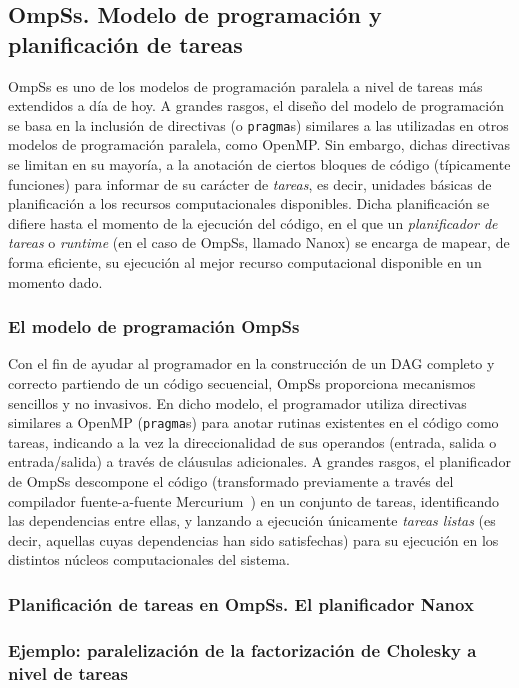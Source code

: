 \subsection{OmpSs. Modelo de programación y planificación de tareas}

OmpSs es uno de los modelos de programación paralela a nivel de tareas más extendidos a día de hoy. A grandes
rasgos, el diseño del modelo de programación se basa en la inclusión de directivas (o {\tt pragma}s) similares
a las utilizadas en otros modelos de programación paralela, como OpenMP. Sin embargo, dichas directivas se limitan
en su mayoría, a la anotación de ciertos bloques de código (típicamente funciones) para informar de su carácter de
{\em tareas}, es decir, unidades básicas de planificación a los recursos computacionales disponibles. Dicha planificación
se difiere hasta el momento de la ejecución del código, en el que un {\em planificador de tareas} o 
{\em runtime} (en el caso de OmpSs, llamado Nanox) se encarga de mapear, de forma eficiente, su ejecución al 
mejor recurso computacional disponible en un momento dado.  

\subsubsection{El modelo de programación OmpSs}

Con el fin de ayudar al programador en la construcción de un DAG completo y correcto partiendo de un código secuencial,
OmpSs proporciona mecanismos sencillos y no invasivos. En dicho modelo, el programador 
utiliza directivas similares a OpenMP ({\tt pragma}s) para anotar rutinas existentes en el código como tareas, indicando
a la vez la direccionalidad de sus operandos (entrada, salida o entrada/salida) a través de cláusulas adicionales. A 
grandes rasgos, el planificador de OmpSs descompone el código (transformado previamente a través del compilador 
fuente-a-fuente Mercurium~\cite{Mercurium}) en un conjunto de tareas, identificando las dependencias entre ellas, 
y lanzando a ejecución únicamente {\em tareas listas} (es decir, aquellas cuyas dependencias han sido satisfechas)
para su ejecución en los distintos núcleos computacionales del sistema.

\subsubsection{Planificación de tareas en OmpSs. El planificador Nanox}

\subsubsection{Ejemplo: paralelización de la factorización de Cholesky a nivel de tareas}

